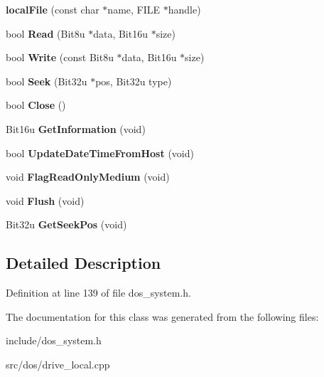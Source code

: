 \begin{DoxyCompactItemize}
\item 
\hypertarget{classlocalFile_ab28a6808847aceacff4d4405cb618bab}{{\bfseries local\-File} (const char $\ast$name, F\-I\-L\-E $\ast$handle)}\label{classlocalFile_ab28a6808847aceacff4d4405cb618bab}

\item 
\hypertarget{classlocalFile_a558f7d758b8818237b26722c466f0f49}{bool {\bfseries Read} (Bit8u $\ast$data, Bit16u $\ast$size)}\label{classlocalFile_a558f7d758b8818237b26722c466f0f49}

\item 
\hypertarget{classlocalFile_a692068e0eb68eaa11661f2246270af1c}{bool {\bfseries Write} (const Bit8u $\ast$data, Bit16u $\ast$size)}\label{classlocalFile_a692068e0eb68eaa11661f2246270af1c}

\item 
\hypertarget{classlocalFile_ab661b8383ca8cf945056571ca982912a}{bool {\bfseries Seek} (Bit32u $\ast$pos, Bit32u type)}\label{classlocalFile_ab661b8383ca8cf945056571ca982912a}

\item 
\hypertarget{classlocalFile_a29a72ec4be5c9f3b0196f2f4d47f5f54}{bool {\bfseries Close} ()}\label{classlocalFile_a29a72ec4be5c9f3b0196f2f4d47f5f54}

\item 
\hypertarget{classlocalFile_a970064b86d4966929fae874542104cba}{Bit16u {\bfseries Get\-Information} (void)}\label{classlocalFile_a970064b86d4966929fae874542104cba}

\item 
\hypertarget{classlocalFile_a6ddb9040bcee2bfb3673228b47042e89}{bool {\bfseries Update\-Date\-Time\-From\-Host} (void)}\label{classlocalFile_a6ddb9040bcee2bfb3673228b47042e89}

\item 
\hypertarget{classlocalFile_a48ed18aa11972f7236cc34928387ff32}{void {\bfseries Flag\-Read\-Only\-Medium} (void)}\label{classlocalFile_a48ed18aa11972f7236cc34928387ff32}

\item 
\hypertarget{classlocalFile_a6fc67afa9e37a05b353d4376a714d495}{void {\bfseries Flush} (void)}\label{classlocalFile_a6fc67afa9e37a05b353d4376a714d495}

\item 
\hypertarget{classlocalFile_ac0b74c929048947e12d164a0430d32e2}{Bit32u {\bfseries Get\-Seek\-Pos} (void)}\label{classlocalFile_ac0b74c929048947e12d164a0430d32e2}

\end{DoxyCompactItemize}


\subsection{Detailed Description}


Definition at line 139 of file dos\-\_\-system.\-h.



The documentation for this class was generated from the following files\-:\begin{DoxyCompactItemize}
\item 
include/dos\-\_\-system.\-h\item 
src/dos/drive\-\_\-local.\-cpp\end{DoxyCompactItemize}
